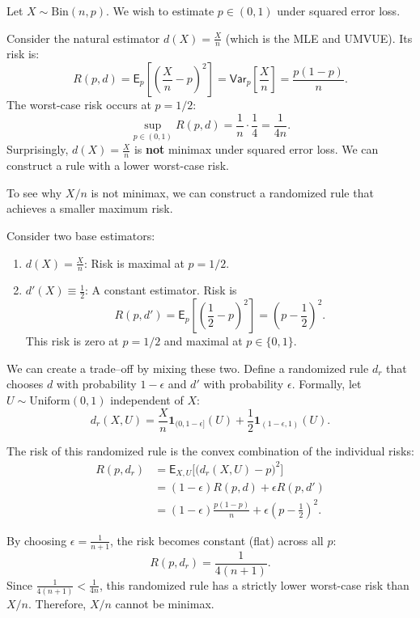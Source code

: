 \begin{ex}
    Let \(X \sim \text{Bin}(n, p)\). We wish to estimate \(p \in (0, 1)\) under squared error loss.
    
    Consider the natural estimator \(d(X) = \frac{X}{n}\) (which is the MLE and UMVUE). Its risk is:
    \[
    R(p,d) = \mathsf{E}_{p}\left[\left( \frac{X}{n}-p \right) ^2\right] = \mathsf{Var}_p \left[ \frac{X}{n} \right] = \frac{p(1-p)}{n}.
    \]
    The worst-case risk occurs at \(p = 1/2\):
    \[
    \sup_{p \in (0,1)} R(p,d) = \frac{1}{n} \cdot \frac{1}{4} = \frac{1}{4n}.
    \]
    Surprisingly, \(d(X) = \frac{X}{n}\) is \textbf{not} minimax under squared error loss. We can construct a rule with a lower worst-case risk.
\end{ex}

To see why \(X/n\) is not minimax, we can construct a randomized rule that achieves a smaller maximum risk.

Consider two base estimators:
\begin{enumerate}[]
\item  \(d(X) = \frac{X}{n}\): Risk is maximal at \(p=1/2\).
\item  \(d'(X) \equiv \frac{1}{2}\): A constant estimator. Risk is
    \[
        R(p, d') = \mathsf{E}_{p}\left[\left( \frac{1}{2}-p \right) ^2\right] = \left(p - \frac{1}{2}\right)^2.
    \]
    This risk is zero at \(p=1/2\) and maximal at \(p \in \{0, 1\}\).
\end{enumerate}

We can create a trade--off by mixing these two. Define a randomized rule \(d_r\) that chooses \(d\) with probability \(1-\epsilon\) and \(d'\) with probability \(\epsilon\).
Formally, let \(U \sim \text{Uniform}(0, 1)\) independent of \(X\):
\[
d_r(X,U) = \frac{X}{n} \mathbf{1}_{(0,1-\epsilon]}(U) + \frac{1}{2} \mathbf{1}_{(1-\epsilon,1)}(U).
\]

The risk of this randomized rule is the convex combination of the individual risks:
\[
\begin{split} 
R(p,d_r) &= \mathsf{E}_{X,U} \Big[ \big( d_r(X,U) - p \big)^2 \Big] \\
&= (1 - \epsilon) R(p,d) + \epsilon R(p,d') \\
&= (1 - \epsilon) \frac{p(1-p)}{n} + \epsilon \left( p - \frac{1}{2} \right)^2.
\end{split}
\]

By choosing \(\epsilon = \frac{1}{n+1}\), the risk becomes constant (flat) across all \(p\):
\[
R(p, d_r) = \frac{1}{4(n+1)}.
\]
Since \(\frac{1}{4(n+1)} < \frac{1}{4n}\), this randomized rule has a strictly lower worst-case risk than \(X/n\). Therefore, \(X/n\) cannot be minimax.

